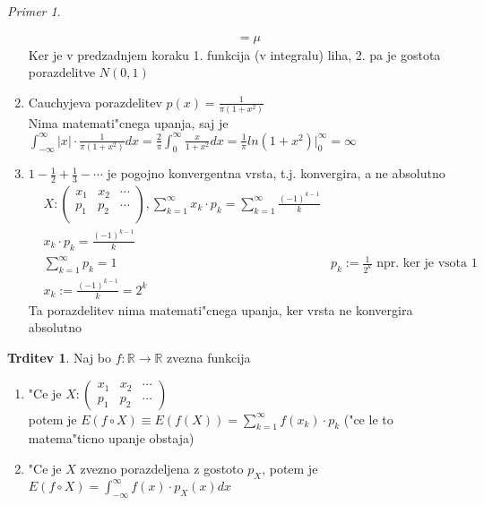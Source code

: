 \documentclass[a4paper,12pt]{article}
\theoremstyle{definition}
\newtheorem{claim}[counter]{Trditev}
\theoremstyle{remark}
\newtheorem*{ex}{Primer}
\newcommand{\R}{\mathbb{R}}
\begin{document}
\begin{ex}
\begin{enumerate}
\begin{align}
                &= \mu
            \end{align}
            Ker je v predzadnjem koraku 1. funkcija (v integralu) liha, 2. pa je gostota porazdelitve $N(0,1)$
        \item Cauchyjeva porazdelitev $p(x) = \frac{1}{\pi (1+x^2)}$ \\ %
            Nima matemati"cnega upanja, saj je $\int_{-\infty}^{\infty} |x| \cdot \frac{1}{\pi (1+x^2)} dx =
            \frac{2}{\pi} \int_{0}^{\infty} \frac{x}{1+x^2} dx = \frac{1}{\pi} ln(1+x^2) \vert_{0}^{\infty} = \infty$
        \item $1 - \frac{1}{2} + \frac{1}{3} - \cdots$ je pogojno konvergentna vrsta, t.j. konvergira, a ne absolutno
            \begin{align*}
                &X: \begin{pmatrix}
                    x_1 & x_2 & \cdots \\
                    p_1 & p_2 & \cdots \\
                \end{pmatrix}, \sum_{k=1}^{\infty} x_k \cdot p_k = \sum_{k=1}^{\infty} \frac{(-1)^{k-1}}{k} \\
                &x_k \cdot p_k = \frac{(-1)^{k-1}}{k} \\
                &\sum_{k=1}^{\infty} p_k = 1
                &p_k := \frac{1}{2^k} \text{ npr. ker je vsota 1} \\
                &x_k := \frac{(-1)^{k-1}}{k} = 2^k
            \end{align*}
            Ta porazdelitev nima matemati"cnega upanja, ker vrsta ne konvergira absolutno
    \end{enumerate}
\end{ex}

\begin{claim}
    Naj bo $f: \R \to \R$ zvezna funkcija
    \begin{enumerate}[label=(\alph*)]
        \item "Ce je $X: \begin{pmatrix} x_1 & x_2 & \cdots \\ p_1 & p_2 & \cdots \end{pmatrix}$ \\
            potem je $E(f \circ X) \equiv E(f(X)) = \sum_{k=1}^{\infty} f(x_k) \cdot p_k$
            ("ce le to matema"ticno upanje obstaja)
        \item "Ce je $X$ zvezno porazdeljena z gostoto $p_X$, potem je $E(f \circ X) =
            \int_{-\infty}^{\infty} f(x) \cdot p_X(x) dx$
    \end{enumerate}
\end{claim}
\end{document}
